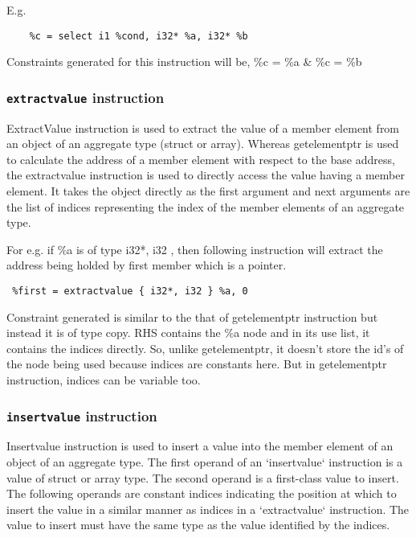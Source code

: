 \documentclass[a4paper,11pt]{report}
\begin{document}
E.g.
\begin{lstlisting}
    %c = select i1 %cond, i32* %a, i32* %b
\end{lstlisting}

Constraints generated for this instruction will be, \%c = \%a \& \%c = \%b

\subsubsection{\texttt{extractvalue} instruction}
ExtractValue instruction is used to extract the value of a member element from 
an object of an aggregate type (struct or array). Whereas getelementptr is used 
to calculate the address of a member element with respect to the base address, 
the extractvalue instruction is used to directly access the value having a 
member element. It takes the object directly as the first argument and next 
arguments are the list of indices representing the index of the member 
elements of an aggregate type.

For e.g. if \%a is of type { i32*, i32 }, then 
following instruction will extract the address being holded by first member 
which is a pointer.

\begin{lstlisting}
 %first = extractvalue { i32*, i32 } %a, 0
\end{lstlisting}

Constraint generated is similar to the that of getelementptr instruction but 
instead it is of type copy. RHS contains the \%a node and in its use list, it 
contains the indices directly. So, unlike getelementptr, it doesn't store the 
id's of the node being used because indices are constants here. But in 
getelementptr instruction, indices can be variable too.

\subsubsection{\texttt{insertvalue} instruction}
Insertvalue instruction is used to insert a value into the member element of an 
object of an aggregate type.
The first operand of an ‘insertvalue‘ instruction is a value of struct or array 
type. The second operand is a first-class value to insert. The following 
operands are constant indices indicating the position at which to insert the 
value in a similar manner as indices in a ‘extractvalue‘ instruction. The value 
to insert must have the same type as the value identified by the indices.
\end{document}
